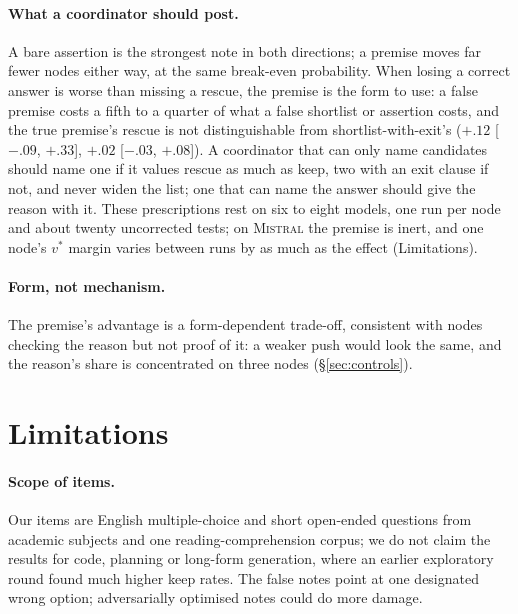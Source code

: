 \documentclass[11pt]{article}
\begin{document}
\paragraph{What a coordinator should post.} A bare assertion is the strongest note in both directions; a premise moves far fewer nodes either way, at the same break-even probability. When losing a correct answer is worse than missing a rescue, the premise is the form to use: a false premise costs a fifth to a quarter of what a false shortlist or assertion costs, and the true premise's rescue is not distinguishable from shortlist-with-exit's ($+.12$ [$-.09$, $+.33$], $+.02$ [$-.03$, $+.08$]). A coordinator that can only name candidates should name one if it values rescue as much as keep, two with an exit clause if not, and never widen the list; one that can name the answer should give the reason with it. These prescriptions rest on six to eight models, one run per node and about twenty uncorrected tests; on \textsc{Mistral} the premise is inert, and one node's $v^\ast$ margin varies between runs by as much as the effect (Limitations).

\paragraph{Form, not mechanism.} The premise's advantage is a form-dependent trade-off, consistent with nodes checking the reason but not proof of it: a weaker push would look the same, and the reason's share is concentrated on three nodes (\S\ref{sec:controls}).
\section{Limitations}

\paragraph{Scope of items.} Our items are English multiple-choice and short open-ended questions from academic subjects and one reading-comprehension corpus; we do not claim the results for code, planning or long-form generation, where an earlier exploratory round found much higher keep rates. The false notes point at one designated wrong option; adversarially optimised notes could do more damage.
\end{document}

